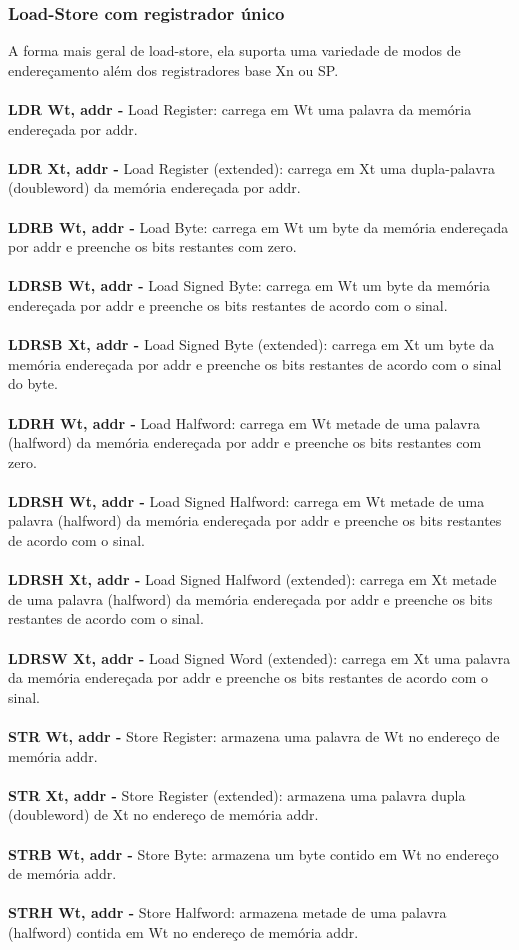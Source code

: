 \documentclass[12pt,a4paper,utf8]{ppgsi}
\begin{document}
\subsubsection{Load-Store com registrador único}
A forma mais geral de load-store, ela suporta uma variedade de modos de endereçamento além dos registradores base Xn ou SP.
\\\\\textbf{LDR Wt, addr -} Load Register: carrega em Wt uma palavra da memória endereçada por addr.
\\\\\textbf{LDR Xt, addr -} Load Register (extended): carrega em Xt uma dupla-palavra (doubleword) da memória endereçada por addr.
\\\\\textbf{LDRB Wt, addr -} Load Byte: carrega em Wt um byte da memória endereçada por addr e preenche os bits restantes com zero.
\\\\\textbf{LDRSB Wt, addr -} Load Signed Byte: carrega em Wt um byte da memória endereçada por addr e preenche os bits restantes de acordo com o sinal.
\\\\\textbf{LDRSB Xt, addr -} Load Signed Byte (extended): carrega em Xt um byte da memória endereçada por addr e preenche os bits restantes de acordo com o sinal do byte.
\\\\\textbf{LDRH Wt, addr -} Load Halfword: carrega em Wt metade de uma palavra (halfword) da memória endereçada por addr e preenche os bits restantes com zero.
\\\\\textbf{LDRSH Wt, addr -} Load Signed Halfword: carrega em Wt metade de uma palavra (halfword) da memória endereçada por addr e preenche os bits restantes de acordo com o sinal.
\\\\\textbf{LDRSH Xt, addr -} Load Signed Halfword (extended): carrega em Xt metade de uma palavra (halfword) da memória endereçada por addr e preenche os bits restantes de acordo com o sinal.
\\\\\textbf{LDRSW Xt, addr -} Load Signed Word (extended): carrega em Xt uma palavra da memória endereçada por addr e preenche os bits restantes de acordo com o sinal.
\\\\\textbf{STR Wt, addr -} Store Register: armazena uma palavra de Wt no endereço de memória addr.
\\\\\textbf{STR Xt, addr -} Store Register (extended): armazena uma palavra dupla (doubleword) de Xt no endereço de memória addr.
\\\\\textbf{STRB Wt, addr -} Store Byte: armazena um byte contido em Wt no endereço de memória addr.
\\\\\textbf{STRH Wt, addr -} Store Halfword: armazena metade de uma palavra (halfword) contida em Wt no endereço de memória addr.
\end{document}
